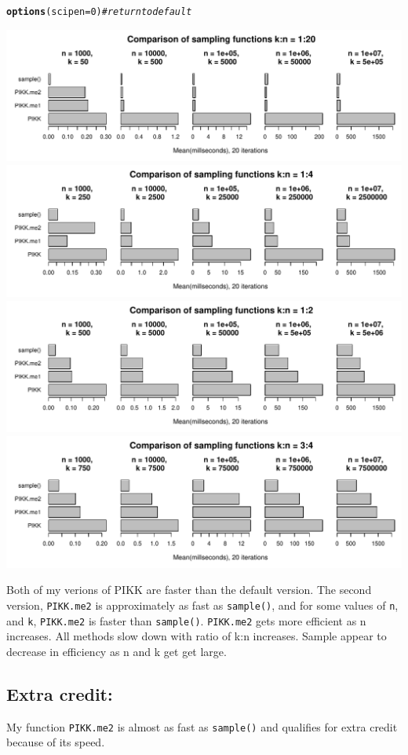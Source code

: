 \documentclass{article}\usepackage[]{graphicx}\usepackage[]{color}
\makeatletter
\def\maxwidth{ %
  \ifdim\Gin@nat@width>\linewidth
    \linewidth
  \else
    \Gin@nat@width
  \fi
}
\newcommand{\hlnum}[1]{\textcolor[rgb]{0.686,0.059,0.569}{#1}}%
\newcommand{\hlcom}[1]{\textcolor[rgb]{0.678,0.584,0.686}{\textit{#1}}}%
\newcommand{\hlstd}[1]{\textcolor[rgb]{0.345,0.345,0.345}{#1}}%
\newcommand{\hlkwc}[1]{\textcolor[rgb]{0.333,0.667,0.333}{#1}}%
\newcommand{\hlkwd}[1]{\textcolor[rgb]{0.737,0.353,0.396}{\textbf{#1}}}%
\newenvironment{kframe}{%
 \def\at@end@of@kframe{}%
 \ifinner\ifhmode%
  \def\at@end@of@kframe{\end{minipage}}%
  \begin{minipage}{\columnwidth}%
 \fi\fi%
 \def\FrameCommand##1{\hskip\@totalleftmargin \hskip-\fboxsep
 \colorbox{shadecolor}{##1}\hskip-\fboxsep
     \hskip-\linewidth \hskip-\@totalleftmargin \hskip\columnwidth}%
 \MakeFramed {\advance\hsize-\width
   \@totalleftmargin\z@ \linewidth\hsize
   \@setminipage}}%
 {\par\unskip\endMakeFramed%
 \at@end@of@kframe}
\newenvironment{knitrout}{}{} %
\makeatother
\begin{document}
\begin{knitrout}
\begin{kframe}
\begin{alltt}
\hlkwd{options}\hlstd{(}\hlkwc{scipen} \hlstd{=} \hlnum{0}\hlstd{)} \hlcom{#return to default}
\end{alltt}
\end{kframe}
\includegraphics[width=\maxwidth]{figure/plots-1} 
\includegraphics[width=\maxwidth]{figure/plots-2} 
\includegraphics[width=\maxwidth]{figure/plots-3} 
\includegraphics[width=\maxwidth]{figure/plots-4} 

\end{knitrout}


Both of my verions of PIKK are faster than the default version. The second version, \texttt{PIKK.me2} is approximately as fast as \texttt{sample()}, and for some values of \texttt{n}, and \texttt{k}, \texttt{PIKK.me2} is faster than \texttt{sample()}. \texttt{PIKK.me2} gets more efficient as n increases. All methods slow down with ratio of k:n increases. Sample appear to decrease in efficiency as n and k get get large.

\subsection{Extra credit:}

My function \texttt{PIKK.me2} is almost as fast as \texttt{sample()} and qualifies for extra credit because of its speed.
\end{document}
